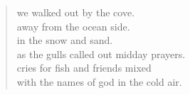 
\begin{verse}
we walked out by the cove. \\
away from the ocean side. \\
in the snow and sand. \\
as the gulls called out midday prayers. \\
cries for fish and friends mixed \\
with the names of god in the cold air.
\end{verse}
